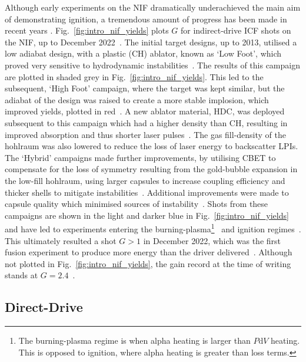Although early experiments on the \ac{NIF} dramatically underachieved the main aim of demonstrating ignition, a tremendous amount of progress has been made in recent years \cite{hurricane_physics_2023}.
Fig.~\ref{fig:intro_nif_yields} plots $G$ for indirect-drive \ac{ICF} shots on the \ac{NIF}, up to December 2022~\cite{abu-shawareb_achievement_2024}.
The initial target designs, up to 2013, utilised a low adiabat design, with a plastic (CH) ablator, known as `Low Foot', which proved very sensitive to hydrodynamic instabilities~\cite{lindl_review_2014}.
The results of this campaign are plotted in shaded grey in Fig.~\ref{fig:intro_nif_yields}.
This led to the subsequent, `High Foot' campaign, where the target was kept similar, but the adiabat of the design was raised to create a more stable implosion, which improved yields, plotted in red~\cite{hurricane_highfoot_2014}.
A new ablator material, \ac{HDC}, was deployed subsequent to this campaign which had a higher density than CH, resulting in improved absorption and thus shorter laser pulses~\cite{mackinnon_highdensity_2014}.
The gas fill-density of the hohlraum was also lowered to reduce the loss of laser energy to backscatter \ac{LPIs}.
The `Hybrid' campaigns made further improvements, by utilising \ac{CBET} to compensate for the loss of symmetry resulting from the gold-bubble expansion in the low-fill hohlraum, using larger capsules to increase coupling efficiency and thicker shells to mitigate instabilities~\cite{zylstra_record_2021}.
Additional improvements were made to capsule quality which minimised sources of instability~\cite{kritcher_design_2024}.
Shots from these campaigns are shown in the light and darker blue in Fig.~\ref{fig:intro_nif_yields} and have led to experiments entering the burning-plasma\footnote{The burning-plasma regime is when alpha heating is larger than $P\text{d}V$ heating. This is opposed to ignition, where alpha heating is greater than loss terms.}~\cite{zylstra_burning_2022,kritcher_design_2022} and ignition regimes~\cite{abu-shawareb_lawson_2022}.
This ultimately resulted a shot $G>1$ in December 2022, which was the first fusion experiment to produce more energy than the driver delivered~\cite{abu-shawareb_achievement_2024}.
Although not plotted in Fig.~\ref{fig:intro_nif_yields}, the gain record at the time of writing stands at $G=2.4$~\cite{_nif_}.

\subsection{Direct-Drive}%
\label{sec:intro_direct}

